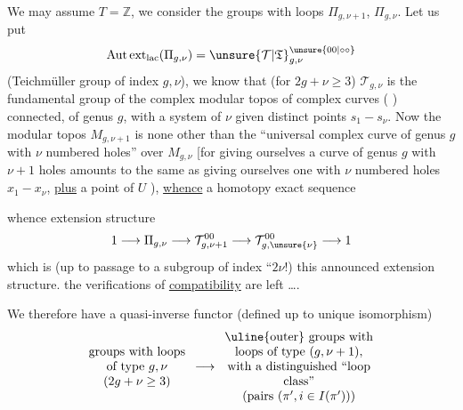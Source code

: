 We may assume \(T=\mathbb Z\), we consider the  groups with loops \(\Pi_{g,\nu+1}\), \(\Pi_{g,\nu}\). Let us put
\[
\operatorname{Aut\,ext}_{\mathrm{lac}}(\Pi_{g,\nu})
=\unsure{\mathcal T|\mathfrak T}_{g,\nu}^{\unsure{00|\circ\circ}}
\]
(Teichmüller group of index \(g,\nu\)),
we know that (for \(2g+\nu\ge3\)) \(\mathcal T_{g,\nu}\) is the fundamental group of the complex modular topos  of complex curves ( ) connected, of genus \(g\), with a system of \(\nu\) given distinct points \(s_1-\!s_\nu\).
Now the modular topos \(M_{g,\nu+1}\) is none other than  the ``universal complex curve  of genus \(g\) with \(\nu\) numbered holes'' over \(M_{g,\nu}\)
[for giving ourselves a curve  of genus \(g\) with \(\nu+1\) holes  amounts to the same as giving ourselves one  with \(\nu\) numbered holes \(x_1-\!x_\nu\), \uline{plus} a  point of \(U\) ), \uline{whence} a homotopy exact sequence


whence  extension structure 
\[
1\longrightarrow\Pi_{g,\nu}
\longrightarrow\mathcal T^{00}_{g,\nu+1}
\longrightarrow\mathcal T^{00}_{g,\unsure{\nu}}
\longrightarrow1
\]
which is (up to passage to a subgroup of index ``\(2\nu!\)) this announced extension structure. \unsure{\&} the verifications of \uline{compatibility} are left \ldots.

We therefore have a quasi-inverse functor (defined up to unique isomorphism)
\[
\begin{array}{c}
\text{groups with loops}\\
\text{of type }g,\nu\\
(2g+\nu\ge3)
\end{array}
\longrightarrow
\begin{array}{c}
\text{\uline{outer} groups with}\\
\text{loops of type }(g,\nu+1),\\
\text{with a distinguished ``loop}\\
\text{class''}\\
\text{(pairs }(\pi',i\in I(\pi'))\text{)}
\end{array}
\]

